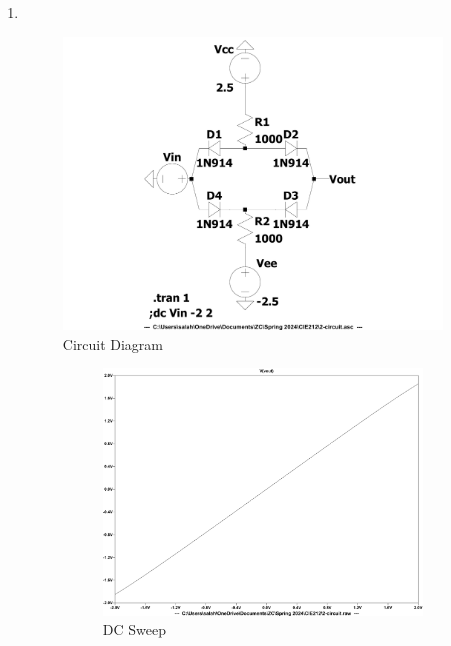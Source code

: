 \documentclass{zc-ust-hw}
\begin{document}
\begin{enumerate}
  \item \,
    \begin{figure}[H]
      \centering
      \includegraphics[width=0.95\textwidth]{figures/2-circuit.pdf}
      \caption{Circuit Diagram}
    \end{figure}
    \begin{figure}[H]
      \centering
      \begin{subfigure}{0.45\textwidth}
        \centering
        \includegraphics[width=\textwidth]{figures/2-dc-sweep.pdf}
        \caption{DC Sweep}
      \end{subfigure}%
      \vspace{1cm}
      \begin{subfigure}{0.45\textwidth}

\end{subfigure}
\end{figure}
\end{enumerate}
\end{document}
